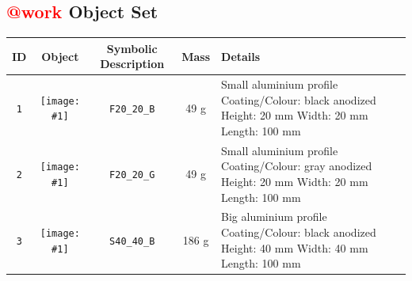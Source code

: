 




\subsection{\textcolor{red}{@work} Object Set}


\newcommand{\imageView}[1]{\texttt{[image: \#1]}}
{
\newcommand{\rowpadding}{0.4cm}
\setlength\extrarowheight{\rowpadding}
\begin{table}[p]

\begin{tabular}{|c|c|c|c|m{8cm}|}
\hline
ID & Object & Symbolic Description & Mass & Details \\
\hline

\texttt{1} & \imageView{./images/F20_20_B.jpg} & \texttt{F20\_20\_B} & 49 g & Small aluminium profile \newline
 Coating/Colour: black anodized\newline
 Height: 20 mm \newline
 Width: 20 mm \newline
 Length: 100 mm \\ [\rowpadding]
\hline

\texttt{2} & \imageView{./images/F20_20_G.jpg} & \texttt{F20\_20\_G} & 49 g & Small aluminium profile \newline
 Coating/Colour: gray anodized\newline
 Height: 20 mm \newline
 Width: 20 mm \newline
 Length: 100 mm \\ [\rowpadding]
\hline

\texttt{3} & \imageView{./images/S40_40_B.jpg} & \texttt{S40\_40\_B} & 186 g & Big aluminium profile\newline
 Coating/Colour: black anodized\newline
 Height: 40 mm \newline
 Width: 40 mm \newline
 Length: 100 mm \\ [\rowpadding]
\hline


\end{tabular}
\end{table}}
